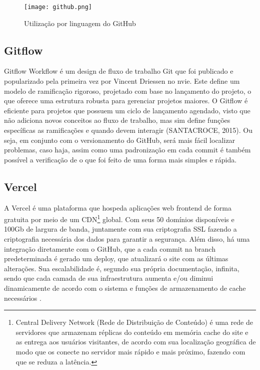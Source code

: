 \begin{figure}[H]
    \caption{\label{utilizacao_github}Utilização por linguagem do GitHub}
    \vspace{5pt}
    \centering
    \texttt{[image: github.png]}
    \vspace{5pt}
\end{figure}

\subsection{Gitflow}
Gitflow Workflow é um design de fluxo de trabalho Git que foi publicado e popularizado pela primeira vez por Vincent Driessen no nvie. Este define um modelo de ramificação rigoroso, projetado com base no lançamento do projeto, o que oferece uma estrutura robusta para gerenciar projetos maiores. O Gitflow é eficiente para projetos que possuem um ciclo de lançamento agendado, visto que não adiciona novos conceitos ao fluxo de trabalho, mas sim define funções específicas as ramificações e quando devem interagir (SANTACROCE, 2015). Ou seja, em conjunto com o versionamento do GitHub, será mais fácil localizar problemas, caso haja, assim como uma padronização em cada commit é também possível a verificação de o que foi feito de uma forma mais simples e rápida.

\subsection{Vercel}
A Vercel é uma plataforma que hospeda aplicações web frontend de forma gratuita por meio de um CDN\footnote{Central Delivery Network (Rede de Distribuição de Conteúdo) é uma rede de servidores que armazenam réplicas do conteúdo em memória cache do site e as entrega aos usuários visitantes, de acordo com sua localização geográfica de modo que os conecte no servidor mais rápido e mais próximo, fazendo com que se reduza a latência.}
global. Com seus 50 domínios disponíveis e 100Gb de largura de banda, juntamente com sua criptografia SSL fazendo a criptografia necessária dos dados para garantir a segurança. Além disso, há uma integração diretamente com o GitHub, que a cada commit na branch predeterminada é gerado um deploy, que atualizará o site com as últimas alterações. Sua escalabilidade é, segundo sua própria documentação, infinita, sendo que cada camada de sua infraestrutura aumenta e/ou diminui dinamicamente de acordo com o sistema e funções de armazenamento de cache necessários \cite{VERCEL}. 

